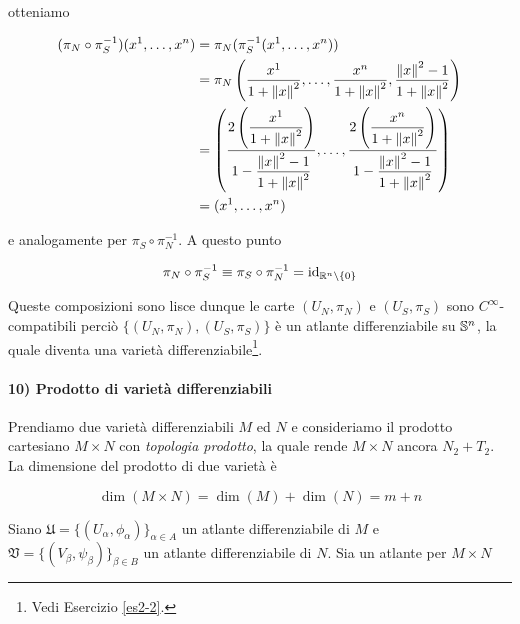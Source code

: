 otteniamo

\begin{align}
	\begin{split}
		(\pi_{N} \circ \pi_{S}^{-1}) (x^{1},\dots,x^{n}) &= \pi_{N} (\pi_{S}^{-1} (x^{1},\dots,x^{n}))\\
		&= \pi_{N} \left( \dfrac{x^{1}}{1+\norm{x}^{2}},\dots,\dfrac{x^{n}}{1+\norm{x}^{2}},\dfrac{\norm{x}^{2}-1}{1+\norm{x}^{2}} \right)\\
		&= \left( \dfrac{ 2 \left( \dfrac{x^{1}}{1 + \norm{x}^{2}} \right) }{ 1 - \dfrac{\norm{x}^{2} - 1}{1 + \norm{x}^{2}} }, \dots, \dfrac{ 2 \left( \dfrac{x^{n}}{1 + \norm{x}^{2}} \right) }{ 1 - \dfrac{\norm{x}^{2} - 1}{1 + \norm{x}^{2}} } \right)\\
		&= (x^{1},\dots,x^{n})
	\end{split}
\end{align}

e analogamente per $ \pi_{S} \circ \pi_{N}^{-1} $. A questo punto

\begin{equation}
	\pi_{N} \circ \pi_{S}^{-1} \equiv \pi_{S} \circ \pi_{N}^{-1} = \id_{\R^{n} \setminus \{0\}}
\end{equation}

Queste composizioni sono lisce dunque le carte $ (U_{N},\pi_{N}) $ e $ (U_{S},\pi_{S}) $ sono $ C^{\infty} $-compatibili perciò $ \{(U_{N},\pi_{N}),(U_{S},\pi_{S})\} $ è un atlante differenziabile su $ \S^{n} $, la quale diventa una varietà differenziabile\footnote{%
	Vedi Esercizio \ref{es2-2}.%
}.

\paragraph{10) Prodotto di varietà differenziabili}

Prendiamo due varietà differenziabili $ M $ ed $ N $ e consideriamo il prodotto cartesiano $ M \times N $ con \textit{topologia prodotto}, la quale rende $ M \times N $ ancora $ N_{2}+T_{2} $. La dimensione del prodotto di due varietà è

\begin{equation}
	\dim (M \times N) = \dim(M) + \dim(N) = m + n
\end{equation}

Siano $ \mathfrak{U} = \{(U_{\alpha},\phi_{\alpha})\}_{\alpha \in A} $ un atlante differenziabile di $ M $ e $ \mathfrak{V} = \{(V_{\beta},\psi_{\beta})\}_{\beta \in B} $ un atlante differenziabile di $ N $. Sia un atlante per $ M \times N $

